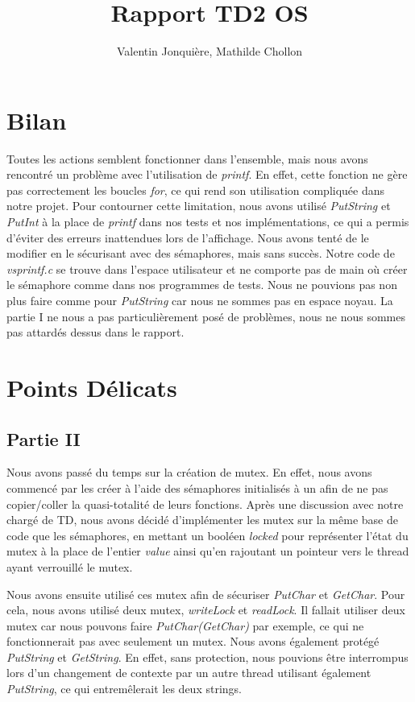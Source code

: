 \documentclass{article}
\author{
    Valentin Jonquière,
    Mathilde Chollon
}
\title{Rapport TD2 OS}
\begin{document}
\maketitle

\pagebreak

\tableofcontents

\pagebreak

\section{Bilan}
Toutes les actions semblent fonctionner dans l'ensemble, mais nous avons rencontré 
un problème avec l'utilisation de \textit{printf}. En effet, cette fonction ne gère pas 
correctement les boucles \textit{for}, ce qui rend son utilisation compliquée dans notre
projet. Pour contourner cette limitation, nous avons utilisé \textit{PutString} et 
\textit{PutInt} à la place de \textit{printf} dans nos tests et nos implémentations, 
ce qui a permis d'éviter des erreurs inattendues lors de l'affichage. Nous avons tenté de le 
modifier en le sécurisant avec des sémaphores, mais sans succès. Notre code de \textit{vsprintf.c}
se trouve dans l'espace utilisateur et ne comporte pas de main où créer le sémaphore comme dans
nos programmes de tests. Nous ne pouvions pas non plus faire comme pour \textit{PutString}
car nous ne sommes pas en espace noyau. La partie I ne nous a pas particulièrement posé de problèmes, nous
ne nous sommes pas attardés dessus dans le rapport.

\section{Points Délicats}
\subsection{Partie II}
Nous avons passé du temps sur la création de mutex. En effet, nous avons
commencé par les créer à l'aide des sémaphores initialisés à un afin de ne pas
copier/coller la quasi-totalité de leurs fonctions. Après une discussion avec
notre chargé de TD, nous avons décidé d'implémenter les mutex sur la même base
de code que les sémaphores, en mettant un booléen \textit{locked} pour
représenter l'état du mutex à la place de l'entier \textit{value} ainsi qu'en
rajoutant un pointeur vers le thread ayant verrouillé le mutex.

Nous avons ensuite utilisé ces mutex afin de sécuriser \textit{PutChar} et \textit{GetChar}.
Pour cela, nous avons utilisé deux mutex, \textit{writeLock} et \textit{readLock}. Il fallait utiliser
deux mutex car nous pouvons faire \textit{PutChar(GetChar)} par exemple, ce qui ne fonctionnerait
pas avec seulement un mutex. Nous avons également protégé \textit{PutString} et \textit{GetString}.
En effet, sans protection, nous pouvions être interrompus lors d'un changement de contexte par un autre
thread utilisant également \textit{PutString}, ce qui entremêlerait les deux strings.
\end{document}
